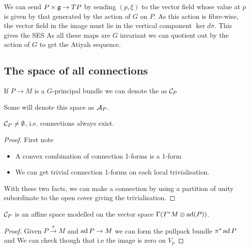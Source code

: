 \documentclass{article}
\begin{document}
\begin{remark}
	We can send $P \times \mathfrak{g} \to TP$ by sending $(p,\xi)$ to the vector field whose value at $p$ is given by that generated by the action of $G$ on $P$. As this action is fibre-wise, the vector field in the image must lie in the vertical component $\ker d\pi$. This gives the SES 
As all these maps are $G$ invariant we can quotient out by the action of $G$ to get the Atiyah sequence. 
\end{remark}

\subsection{The space of all connections}

\begin{definition}
If $P \to M$ is a $G$-principal bundle we can denote the  as $\mathcal{C}_P$
\end{definition} 

\begin{remark}
	Some will denote this space as $\mathcal{A}_P$. 
\end{remark}

\begin{prop}
	$\mathcal{C}_P \neq \emptyset$, i.e. connections always exist. 
\end{prop}
\begin{proof}
	First note 
	\begin{itemize}
		\item A convex combination of connection 1-forms is a 1-form
		\item We can get trivial connection 1-forms on each local trivialisation. 
	\end{itemize}
	With these two facts, we can make a connection by using a partition of unity subordinate to the open cover giving the trivialisation. 
\end{proof}

\begin{prop}
	$\mathcal{C}_P$ is an affine space modelled on the vector space $\Gamma(T^\ast M \otimes \operatorname{ad}(P))$. 
\end{prop}
\begin{proof}
	Given $P\overset{\pi}{\to} M$ and $\operatorname{ad} P \to M$ we can form the pullpack bundle $\pi^\ast \operatorname{ad} P$ and 
We can check though that 
i.e the image is zero on $V_p$
\end{proof}
\end{document}
